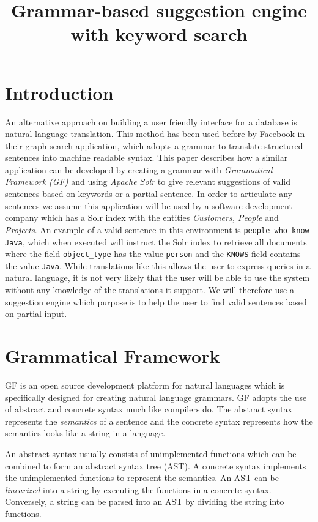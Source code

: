 \documentclass[10pt, a4paper]{article}
\title{Grammar-based suggestion engine with keyword search}
\begin{document}
\maketitleabstract

\section{Introduction}
An alternative approach on building a user friendly interface for a database is  natural language translation. This method has been used before by Facebook \cite{li:2013} in their graph search application, which adopts a grammar to translate structured sentences into machine readable syntax. This paper describes how a similar application can be developed by creating a grammar with \emph{Grammatical Framework (GF)} \cite{ranta:2013} and using \emph{Apache Solr} \cite{kuc:2011} to give relevant suggestions of valid sentences based on keywords or a partial sentence.
\newline
\newline
In order to articulate any sentences we assume this application will be used by a software development company which has a Solr index with the entities \emph{Customers, People} and \emph{Projects}. An example of a valid sentence in this environment is \texttt{people who know Java}, which when executed will instruct the Solr index to retrieve all documents where the field \texttt{object\_type} has the value \texttt{person} and the \texttt{KNOWS}-field contains the value \texttt{Java}. While translations like this allows the user to express queries in a natural language, it is not very likely that the user will be able to use the system without any knowledge of the translations it support. We will therefore use a suggestion engine which purpose is to help the user to find valid sentences based on partial input.

\section{Grammatical Framework}
GF is an open source development platform for natural languages which is specifically designed for creating natural language grammars. GF adopts the use of abstract and concrete syntax much like compilers do. The abstract syntax represents the \emph{semantics} of a sentence and the concrete syntax represents how the semantics looks like a string in a language. 

An abstract syntax usually consists of unimplemented functions which can be combined to form an abstract syntax tree (AST). A concrete syntax implements the unimplemented functions to represent the semantics. An AST can be \emph{linearized} into a string by executing the functions in a concrete syntax. Conversely, a string can be parsed into an AST by dividing the string into functions.
\end{document}
